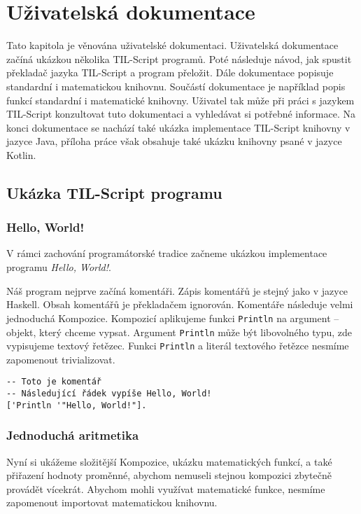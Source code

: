 \chapter{Uživatelská dokumentace}

Tato kapitola je věnována uživatelské dokumentaci. Uživatelská dokumentace začíná ukázkou několika
TIL-Script programů. Poté následuje návod, jak spustit překladač jazyka TIL-Script a program
přeložit. Dále dokumentace popisuje standardní i matematickou knihovnu. Součástí dokumentace je
například popis funkcí standardní i matematické knihovny. Uživatel tak může při práci s jazykem
TIL-Script konzultovat tuto dokumentaci a vyhledávat si potřebné informace. Na konci dokumentace
se nachází také ukázka implementace TIL-Script knihovny v jazyce Java, příloha práce však obsahuje
také ukázku knihovny psané v jazyce Kotlin.

\section{Ukázka TIL-Script programu}

\subsection{Hello, World!}

V rámci zachování programátorské tradice začneme ukázkou implementace programu
\textit{Hello, World!}.

Náš program nejprve začíná komentáři. Zápis komentářů je stejný jako v jazyce Haskell. Obsah
komentářů je překladačem ignorován. Komentáře následuje velmi jednoduchá Kompozice. Kompozicí
aplikujeme funkci \lstinline{Println} na argument -- objekt, který chceme vypsat. Argument
\lstinline{Println} může být
libovolného typu, zde vypisujeme textový řetězec. Funkci \lstinline{Println} a literál textového
řetězce nesmíme zapomenout trivializovat.

\begin{lstlisting}[caption={Program Hello, World! v jazyce TIL-Script}]
-- Toto je komentář
-- Následující řádek vypíše Hello, World!
['Println '"Hello, World!"].
\end{lstlisting}

\subsection{Jednoduchá aritmetika}

Nyní si ukážeme složitější Kompozice, ukázku matematických funkcí, a také přiřazení hodnoty
proměnné, abychom nemuseli stejnou kompozici zbytečně provádět vícekrát. Abychom mohli využívat
matematické funkce, nesmíme zapomenout importovat matematickou knihovnu.

